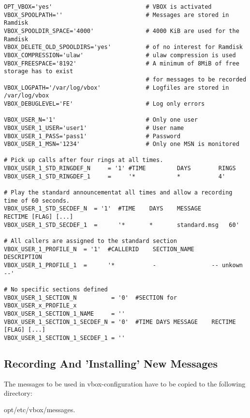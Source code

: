 \begin{verbatim}
OPT_VBOX='yes'                           # VBOX is activated
VBOX_SPOOLPATH=''                        # Messages are stored in Ramdisk
VBOX_SPOOLDIR_SPACE='4000'               # 4000 KiB are used for the Ramdisk
VBOX_DELETE_OLD_SPOOLDIRS='yes'          # of no interest for Ramdisk
VBOX_COMPRESSION='ulaw'                  # ulaw compression is used
VBOX_FREESPACE='8192'                    # A minimum of 8MiB of free storage has to exist
                                         # for messages to be recorded
VBOX_LOGPATH='/var/log/vbox'             # Logfiles are stored in /var/log/vbox
VBOX_DEBUGLEVEL='FE'                     # Log only errors

VBOX_USER_N='1'                          # Only one user
VBOX_USER_1_USER='user1'                 # User name
VBOX_USER_1_PASS='pass1'                 # Password
VBOX_USER_1_MSN='1234'                   # Only one MSN is monitored

# Pick up calls after four rings at all times.
VBOX_USER_1_STD_RINGDEF_N     = '1' #TIME         DAYS        RINGS
VBOX_USER_1_STD_RINGDEF_1     =     '*            *           4'

# Play the standard announcementat all times and allow a recording time of 60 seconds.
VBOX_USER_1_STD_SECDEF_N  = '1'  #TIME    DAYS    MESSAGE        RECTIME [FLAG] [...]
VBOX_USER_1_STD_SECDEF_1  =      '*       *       standard.msg   60'

# All callers are assigned to the standard section
VBOX_USER_1_PROFILE_N  = '1'  #CALLERID    SECTION_NAME     DESCRIPTION
VBOX_USER_1_PROFILE_1  =      '*           -                -- unkown --'

# No specific sections defined
VBOX_USER_1_SECTION_N          = '0'  #SECTION for VBOX_USER_x_PROFILE_x
VBOX_USER_1_SECTION_1_NAME     = ''
VBOX_USER_1_SECTION_1_SECDEF_N = '0'  #TIME DAYS MESSAGE 	RECTIME [FLAG] [...]
VBOX_USER_1_SECTION_1_SECDEF_1 = ''

\end{verbatim}    

\subsection{Recording And 'Installing' New Messages}

The messages to be used in vbox-configuration have to be copied to the following directory:

opt/etc/vbox/messages.

